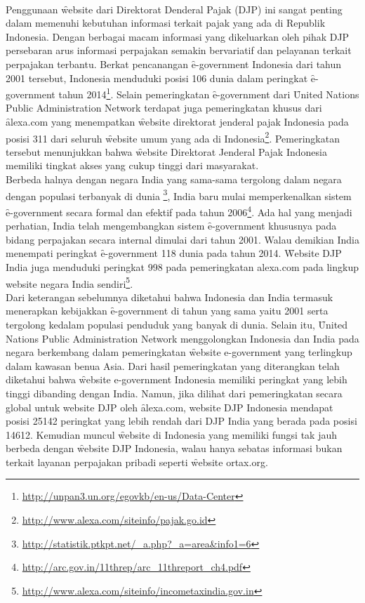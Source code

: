\newline\\
Penggunaan \f{website} dari Direktorat Denderal Pajak (DJP) ini sangat penting dalam memenuhi kebutuhan informasi terkait pajak yang ada di Republik Indonesia. Dengan berbagai macam informasi yang dikeluarkan oleh pihak DJP persebaran arus informasi perpajakan semakin bervariatif dan pelayanan terkait perpajakan terbantu. Berkat pencanangan \f{e-government} Indonesia dari tahun 2001 tersebut, Indonesia menduduki posisi 106 dunia dalam peringkat \f{e-government} tahun 2014\footnote{\url{http://unpan3.un.org/egovkb/en-us/Data-Center}}. Selain pemeringkatan \f{e-government} dari \f{United Nations Public Administration Network} terdapat juga pemeringkatan khusus dari \f{alexa.com} yang menempatkan \f{website} direktorat jenderal pajak Indonesia pada posisi 311 dari seluruh \f{website} umum yang ada di Indonesia\footnote{\url{http://www.alexa.com/siteinfo/pajak.go.id}}. Pemeringkatan tersebut menunjukkan bahwa \f{website} Direktorat Jenderal Pajak Indonesia memiliki tingkat akses yang cukup tinggi dari masyarakat. 
\newline\\
Berbeda halnya dengan negara India yang sama-sama tergolong dalam negara dengan populasi terbanyak di dunia \footnote{\url{http://statistik.ptkpt.net/_a.php?_a=area&info1=6}}, India baru mulai memperkenalkan sistem \f{e-government} secara formal dan efektif pada tahun 2006\footnote{\url{http://arc.gov.in/11threp/arc_11threport_ch4.pdf}}. Ada hal yang menjadi perhatian, India telah mengembangkan sistem \f{e-government} khususnya pada bidang perpajakan secara internal dimulai dari tahun 2001. Walau demikian India menempati peringkat \f{e-government} 118 dunia pada tahun 2014. \f{Website} DJP India juga menduduki peringkat 998 pada pemeringkatan alexa.com pada lingkup website negara India sendiri\footnote{\url{http://www.alexa.com/siteinfo/incometaxindia.gov.in}}.
\newline\\
Dari keterangan sebelumnya diketahui bahwa Indonesia dan India termasuk menerapkan kebijakkan \f{e-government} di tahun yang sama yaitu 2001 serta tergolong kedalam populasi penduduk yang banyak di dunia. Selain itu, \f{United Nations Public Administration Network} menggolongkan Indonesia dan India pada negara berkembang dalam pemeringkatan \f{website e-government} yang terlingkup dalam kawasan benua Asia. Dari hasil pemeringkatan yang diterangkan telah diketahui bahwa \f{website e-government} Indonesia memiliki peringkat yang lebih tinggi dibanding dengan India. Namun, jika dilihat dari pemeringkatan secara global untuk website DJP oleh \f{alexa.com, website} DJP Indonesia mendapat posisi 25142 peringkat yang lebih rendah dari DJP India yang berada pada posisi 14612. Kemudian muncul \f{website} di Indonesia yang memiliki fungsi tak jauh berbeda dengan \f{website} DJP Indonesia, walau hanya sebatas informasi bukan terkait layanan perpajakan pribadi seperti \f{website ortax.org}.
